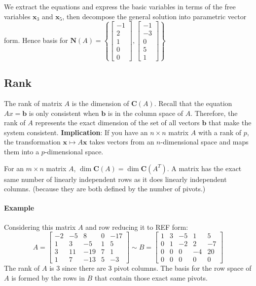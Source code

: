\documentclass[../linear-algebra.tex]{subfiles}
\begin{document}
We extract the equations and express the basic variables in terms of the free variables $\mathbf{x}_3$ and $\mathbf{x}_5$, then decompose the general solution into parametric vector form.\newline
Hence basis for $\mathbf{N}(A) = \left\{ \begin{bmatrix} -1 \\ 2 \\ 1 \\ 0 \\ 0 \end{bmatrix}, \begin{bmatrix} -1 \\ -3 \\ 0 \\ 5 \\ 1 \end{bmatrix} \right\}$

\subsection{Rank}
The rank of matrix $A$ is the dimension of $\mathbf{C}(A)$.\newline
Recall that the equation $Ax = \mathbf{b}$ is only consistent when $\mathbf{b}$ is in the column space of $A$. Therefore, the rank of $A$ represents the exact dimension of the set of all vectors $\mathbf{b}$ that make the system consistent.\newline
\textbf{Implication}: If you have an $n \times n$ matrix $A$ with a rank of $p$, the transformation $\mathbf{x} \mapsto A\mathbf{x}$ takes vectors from an $n$-dimensional space and maps them into a $p$-dimensional space.

\medskip
\noindent For an $m \times n$ matrix $A$, $\dim \mathbf{C}(A) = \dim \mathbf{C}(A^T)$. A matrix has the exact same number of linearly independent rows as it does linearly independent columns. (because they are both defined by the number of pivots.)
\paragraph{Example} Considering this matrix $A$ and row reducing it to REF form:
$$A = \begin{bmatrix} -2 & -5 & 8 & 0 & -17 \\ 1 & 3 & -5 & 1 & 5 \\ 3 & 11 & -19 & 7 & 1 \\ 1 & 7 & -13 & 5 & -3 \end{bmatrix} \sim B = \begin{bmatrix} 1 & 3 & -5 & 1 & 5 \\ 0 & 1 & -2 & 2 & -7 \\ 0 & 0 & 0 & -4 & 20 \\ 0 & 0 & 0 & 0 & 0 \end{bmatrix}$$
The rank of $A$ is 3 since there are 3 pivot columns. The basis for the row space of $A$ is formed by the rows in $B$ that contain those exact same pivots.
\end{document}
